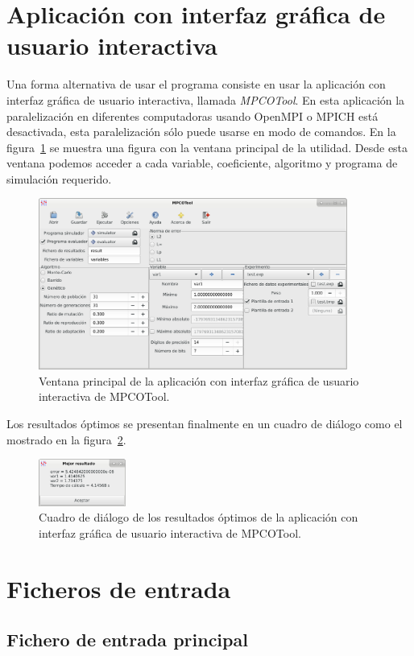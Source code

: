 \documentclass[a4paper]{report}
\begin{document}
\section{Aplicación con interfaz gráfica de usuario interactiva}

Una forma alternativa de usar el programa consiste en usar la aplicación con
interfaz gráfica de usuario interactiva, llamada \emph{MPCOTool}. En esta
aplicación la paralelización en diferentes computadoras usando OpenMPI o MPICH
está desactivada, esta paralelización sólo puede usarse en modo de comandos. En
la figura~\ref{FigWindow} se muestra una figura con la ventana principal de la
utilidad. Desde esta ventana podemos acceder a cada variable, coeficiente,
algoritmo y programa de simulación requerido.
\begin{figure}[ht!]
	\centering
	\includegraphics[width=10.13cm]{mpcotool-es.eps}
	\caption{Ventana principal de la aplicación con interfaz gráfica de usuario
		interactiva de MPCOTool.\label{FigWindow}}
\end{figure}

Los resultados óptimos se presentan finalmente en un cuadro de diálogo como el
mostrado en la figura~\ref{FigResult}.
\begin{figure}[ht!]
	\centering
	\includegraphics[width=2.87cm]{result-es.eps}
	\caption{Cuadro de diálogo de los resultados óptimos de la aplicación con
		interfaz gráfica de usuario interactiva de MPCOTool.\label{FigResult}}
\end{figure}

\section{Ficheros de entrada}

\subsection{Fichero de entrada principal}
\end{document}
